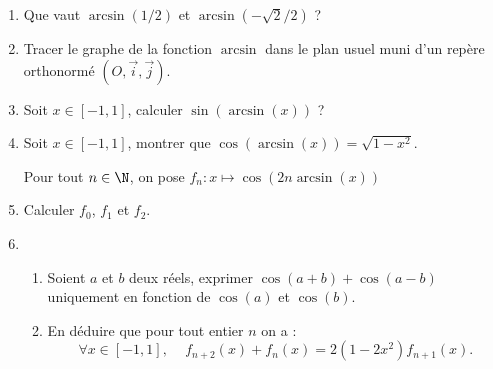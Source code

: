




\begin{exercice}
\begin{enumerate}
\item Que vaut $\arcsin(1/2)$ et $\arcsin(-\sqrt{2}/2)$ ?
\item Tracer le graphe de la fonction $\arcsin$ dans le plan usuel muni d'un repère orthonormé $(O, \vec{i}, \vec{j})$.
\item Soit $x\in [-1, 1]$, calculer  $\sin(\arcsin(x))$ ?
\item Soit $x\in [-1, 1]$, montrer que  $\cos(\arcsin(x)) = \sqrt{1-x^2}$.

 Pour tout $n\in \N$, on pose $f_n  : x\mapsto \cos(2n \arcsin(x))$ 
\item Calculer $f_0$, $f_1$ et $f_2$. 
\item \begin{enumerate}
\item Soient $a$ et $b$ deux réels, exprimer $\cos(a+b) +\cos(a-b)$ uniquement en fonction de $\cos(a)$ et $\cos(b)$. 
\item En déduire que pour tout entier $n$ on  a :
$$\forall x \in [-1, 1], \, \quad f_{n+2}(x) + f_n(x) =2(1-2x^2) f_{n+1}(x).$$
\end{enumerate}
\end{enumerate}


\end{exercice}

